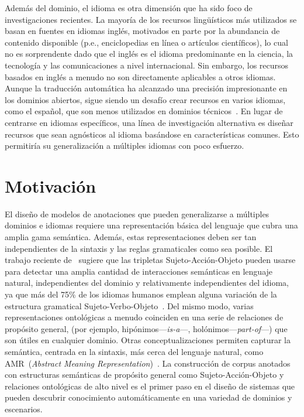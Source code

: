Además del dominio, el idioma es otra dimensión que ha sido foco de investigaciones recientes.
La mayoría de los recursos lingüísticos más utilizados se basan en fuentes en idiomas inglés, motivados en parte por la abundancia de contenido disponible (p.e., enciclopedias en línea o artículos científicos), lo cual no es sorprendente dado que el inglés es el idioma predominante en la ciencia, la tecnología y las comunicaciones a nivel internacional.
Sin embargo, los recursos basados en inglés a menudo no son directamente aplicables a otros idiomas.
Aunque la traducción automática ha alcanzado una precisión impresionante en los dominios abiertos, sigue siendo un desafío crear recursos en varios idiomas, como el español, que son menos utilizados en dominios técnicos~\cite{villegas2018mespen}.
En lugar de centrarse en idiomas específicos, una línea de investigación alternativa es diseñar recursos que sean agnósticos al idioma basándose en características comunes.
Esto permitiría su generalización a múltiples idiomas con poco esfuerzo.

\section{Motivación}
\label{chap1:motivation}

El diseño de modelos de anotaciones que pueden generalizarse a múltiples dominios e idiomas requiere una representación básica del lenguaje que cubra una amplia gama semántica.
Además, estas representaciones deben ser tan independientes de la sintaxis y las reglas gramaticales como sea posible.
El trabajo reciente de~\citet{estevez2018gathering} sugiere que las tripletas Sujeto-Acción-Objeto pueden usarse para detectar una amplia cantidad de interacciones semánticas en lenguaje natural, independientes del dominio y relativamente independientes del idioma, ya que más del 75\% de los idiomas humanos emplean alguna variación de la estructura gramatical Sujeto-Verbo-Objeto~\cite{crystal2004cambridge}.
Del mismo modo, varias representaciones ontológicas a menudo coinciden en una serie de relaciones de propósito general, (por ejemplo, hipónimos---\textit{is-a}---,  holónimos---\textit{part-of}---) que son útiles en cualquier dominio.
Otras conceptualizaciones permiten capturar la semántica, centrada en la sintaxis, más cerca del lenguaje natural, como  AMR~(\textit{Abstract Meaning Representation})~\cite{banarescu2013abstract}.
La construcción de corpus anotados con estructuras semánticas de propósito general como Sujeto-Acción-Objeto y relaciones ontológicas de alto nivel es el primer paso en el diseño de sistemas que pueden descubrir conocimiento automáticamente en una variedad de dominios y escenarios.

